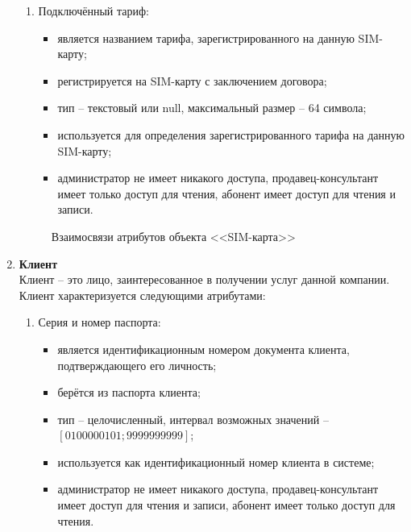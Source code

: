 \begin{enumerate}
\begin{enumerate}
        \item Подключённый тариф:
        \begin{itemize}
            \item является названием тарифа, зарегистрированного на данную SIM-карту;
            \item регистрируется на SIM-карту с заключением договора;
            \item тип -- текстовый или null, максимальный размер -- 64 символа;
            \item используется для определения зарегистрированного тарифа на данную SIM-карту;
            \item администратор не имеет никакого доступа, продавец-консультант имеет только доступ для чтения, абонент имеет доступ для чтения и записи.
        \end{itemize}
    \end{enumerate}
    \begin{figure}[H]
        \label{fig:sim-card-attributes}
        \caption{Взаимосвязи атрибутов объекта <<SIM-карта>>}
    \end{figure}

    \item \textbf{Клиент} \\
    Клиент -- это лицо, заинтересованное в получении услуг данной компании. Клиент характеризуется следующими атрибутами:
    \begin{enumerate}
        \item Серия и номер паспорта:
        \begin{itemize}
            \item является идентификационным номером документа клиента, подтверждающего его личность;
            \item берётся из паспорта клиента;
            \item тип -- целочисленный, интервал возможных значений -- $[0100000101; 9999999999]$;
            \item используется как идентификационный номер клиента в системе;
            \item администратор не имеет никакого доступа, продавец-консультант имеет доступ для чтения и записи, абонент имеет только доступ для чтения.
        \end{itemize}


\end{enumerate}
\end{enumerate}
